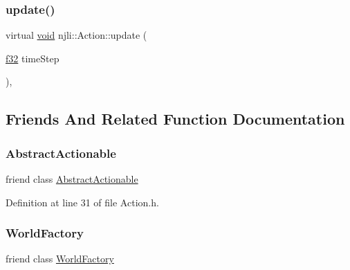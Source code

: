 \subsubsection{\texorpdfstring{update()}{update()}}
{\footnotesize\ttfamily virtual \mbox{\hyperlink{_thread_8h_af1e856da2e658414cb2456cb6f7ebc66}{void}} njli\+::\+Action\+::update (\begin{DoxyParamCaption}\item[{\mbox{\hyperlink{_util_8h_a5f6906312a689f27d70e9d086649d3fd}{f32}}}]{time\+Step }\end{DoxyParamCaption})\hspace{0.3cm}{\ttfamily [protected]}, {\ttfamily [virtual]}}



\subsection{Friends And Related Function Documentation}
\mbox{\label{classnjli_1_1_action_acae59ef0f73ad6fe5d30782b3054c2a0}} 
\subsubsection{\texorpdfstring{Abstract\+Actionable}{AbstractActionable}}
{\footnotesize\ttfamily friend class \mbox{\hyperlink{classnjli_1_1_abstract_actionable}{Abstract\+Actionable}}\hspace{0.3cm}{\ttfamily [friend]}}



Definition at line 31 of file Action.\+h.

\mbox{\label{classnjli_1_1_action_acb96ebb09abe8f2a37a915a842babfac}} 
\subsubsection{\texorpdfstring{World\+Factory}{WorldFactory}}
{\footnotesize\ttfamily friend class \mbox{\hyperlink{classnjli_1_1_world_factory}{World\+Factory}}\hspace{0.3cm}{\ttfamily [friend]}}



